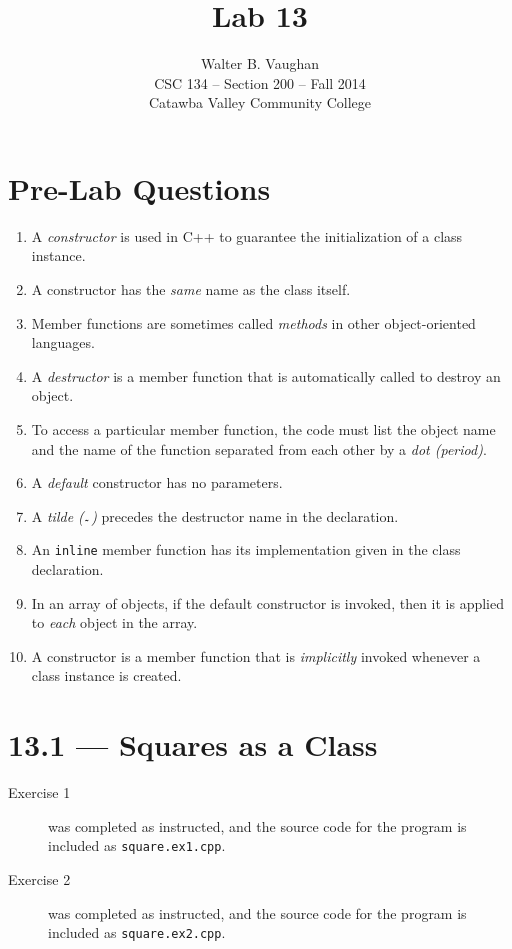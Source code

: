 \documentclass[11pt]{article}
\author{Walter B. Vaughan\\
        \small CSC 134 -- Section 200 -- Fall 2014\\
        \small Catawba Valley Community College}
\title{Lab 13}
\date{\vspace{-5ex}}
\begin{document}
\maketitle


\section*{Pre-Lab Questions}
\begin{enumerate}
    \item A \emph{constructor} is used in C++ to guarantee the initialization of a class instance.
    \item A constructor has the \emph{same} name as the class itself.
    \item Member functions are sometimes called \emph{methods} in other object-oriented languages.
    \item A \emph{destructor} is a member function that is automatically called to destroy an object.
    \item To access a particular member function, the code must list the object name and the name of the function separated from each other by a \emph{dot (period)}.
    \item A \emph{default} constructor has no parameters.
    \item A \emph{tilde (${}_{\texttt{\symbol{126}}}$)} precedes the destructor name in the declaration.
    \item An \lstinline{inline} member function has its implementation given in the class declaration.
    \item In an array of objects, if the default constructor is invoked, then it is applied to \emph{each} object in the array.
    \item A constructor is a member function that is \emph{implicitly} invoked whenever a class instance is created.
\end{enumerate}
\newpage

\section*{13.1 --- Squares as a Class}
\begin{description}
    \item[Exercise 1] was completed as instructed, and the source code for the program is included as \texttt{square.ex1.cpp}.
    \item[Exercise 2] was completed as instructed, and the source code for the program is included as \texttt{square.ex2.cpp}.
\end{description}
\end{document}
